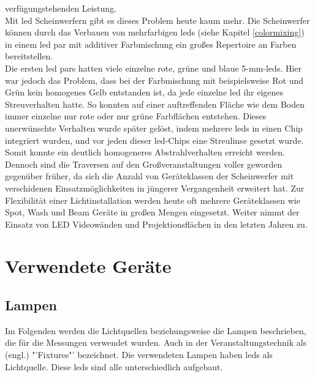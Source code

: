 \documentclass[11pt]{scrartcl}
\begin{document}
verfügungstehenden Leistung.\\
Mit \ac{led} Scheinwerfern gibt es dieses Problem heute kaum mehr. Die Scheinwerfer können durch das Verbauen von mehrfarbigen \ac{led}s
(siehe Kapitel \ref{colormixing}) in einem \ac{led} \ac{par} mit additiver Farbmischung ein großes Repertoire an Farben bereitstellen.\\
Die ersten \ac{led} \ac{par}s hatten viele einzelne rote, grüne und blaue 5-mm-\ac{led}s. Hier war jedoch das Problem, dass bei der
Farbmischung mit beispielsweise Rot und Grün kein homogenes Gelb entstanden ist, da jede einzelne \ac{led} ihr eigenes Streuverhalten
hatte. So konnten auf einer auftreffenden Fläche wie dem Boden immer einzelne nur rote oder nur grüne Farbflächen entstehen. Dieses
unerwünschte Verhalten wurde später gelöst, indem mehrere \ac{led}s in einen Chip integriert wurden, und vor jeden dieser \ac{led}-Chips
eine Streulinse gesetzt wurde. Somit konnte ein deutlich homogeneres Abstrahlverhalten erreicht werden.\\
Dennoch sind die Traversen auf den Großveranstaltungen voller geworden gegenüber früher, da sich die Anzahl von Geräteklassen der
Scheinwerfer mit verschidenen Einsatzmöglichkeiten in jüngerer Vergangenheit erweitert hat. Zur Flexibilität einer Lichtinstallation werden
heute oft mehrere Geräteklassen wie Spot, Wash und Beam Geräte in großen Mengen eingesetzt. Weiter nimmt der Einsatz von LED Videowänden
und Projektionsflächen in den letzten Jahren zu.
\clearpage

\section{Verwendete Geräte}
\subsection{Lampen}\label{lamps}
Im Folgenden werden die Lichtquellen beziehungsweise die Lampen beschrieben, die für die Messungen verwendet wurden.
Auch in der Veranstaltungstechnik als (engl.) "'Fixtures"' bezeichnet. Die verwendeten Lampen haben \ac{led}s als Lichtquelle. Diese
\ac{led}s sind alle unterschiedlich aufgebaut.
\end{document}
